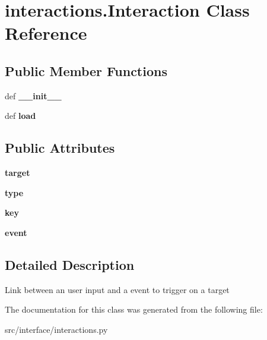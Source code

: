 \hypertarget{classinteractions_1_1_interaction}{\section{interactions.\-Interaction \-Class \-Reference}
\label{classinteractions_1_1_interaction}
}
\subsection*{\-Public \-Member \-Functions}
\begin{DoxyCompactItemize}
\item 
\hypertarget{classinteractions_1_1_interaction_aaa6e9bc32038ac4f7d2bcd294e5e85b5}{def {\bfseries \-\_\-\-\_\-init\-\_\-\-\_\-}}\label{classinteractions_1_1_interaction_aaa6e9bc32038ac4f7d2bcd294e5e85b5}

\item 
\hypertarget{classinteractions_1_1_interaction_a71af2ff170e4f1debf8ed4c6744345cc}{def {\bfseries load}}\label{classinteractions_1_1_interaction_a71af2ff170e4f1debf8ed4c6744345cc}

\end{DoxyCompactItemize}
\subsection*{\-Public \-Attributes}
\begin{DoxyCompactItemize}
\item 
\hypertarget{classinteractions_1_1_interaction_a0f4421e15900e2969a00b387b1a106e7}{{\bfseries target}}\label{classinteractions_1_1_interaction_a0f4421e15900e2969a00b387b1a106e7}

\item 
\hypertarget{classinteractions_1_1_interaction_af6ed27e94e03e0ee01fac332fc95bdf4}{{\bfseries type}}\label{classinteractions_1_1_interaction_af6ed27e94e03e0ee01fac332fc95bdf4}

\item 
\hypertarget{classinteractions_1_1_interaction_a86c59f8f535237eda4da810aa0176183}{{\bfseries key}}\label{classinteractions_1_1_interaction_a86c59f8f535237eda4da810aa0176183}

\item 
\hypertarget{classinteractions_1_1_interaction_a4f475a53f0a9b31dee3046d60809d347}{{\bfseries event}}\label{classinteractions_1_1_interaction_a4f475a53f0a9b31dee3046d60809d347}

\end{DoxyCompactItemize}


\subsection{\-Detailed \-Description}
\begin{DoxyVerb}Link between an user input and a event to trigger on a target \end{DoxyVerb}
 

\-The documentation for this class was generated from the following file\-:\begin{DoxyCompactItemize}
\item 
src/interface/interactions.\-py\end{DoxyCompactItemize}
